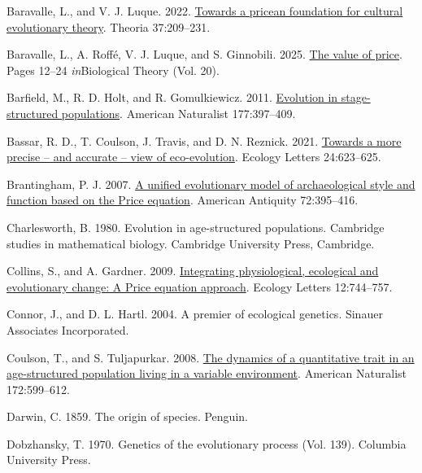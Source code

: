 \documentclass[
]{article}
\newlength{\cslhangindent}
\newenvironment{CSLReferences}[2] %
 {\begin{list}{}{%
  \setlength{\itemindent}{0pt}
  \setlength{\leftmargin}{0pt}
  \setlength{\parsep}{0pt}
  \ifodd #1
   \setlength{\leftmargin}{\cslhangindent}
   \setlength{\itemindent}{-1\cslhangindent}
  \fi
  \setlength{\itemsep}{#2\baselineskip}}}
 {\end{list}}
\begin{document}
\label{refs}
\begin{CSLReferences}{0}{0}
Baravalle, L., and V. J. Luque. 2022.
\href{https://doi.org/10.1387/theoria.21940}{Towards a pricean
foundation for cultural evolutionary theory}. Theoria 37:209--231.

Baravalle, L., A. Roffé, V. J. Luque, and S. Ginnobili. 2025.
\href{https://doi.org/10.1007/s13752-024-00482-4}{The value of price}.
Pages 12--24 \emph{in}Biological Theory (Vol. 20).

Barfield, M., R. D. Holt, and R. Gomulkiewicz. 2011.
\href{https://doi.org/10.1086/658903}{Evolution in stage-structured
populations}. American Naturalist 177:397--409.

Bassar, R. D., T. Coulson, J. Travis, and D. N. Reznick. 2021.
\href{https://doi.org/10.1111/ele.13712}{Towards a more precise -- and
accurate -- view of eco-evolution}. Ecology Letters 24:623--625.

Brantingham, P. J. 2007. \href{https://doi.org/10.2307/40035853}{{A
unified evolutionary model of archaeological style and function based on
the Price equation}}. American Antiquity 72:395--416.

Charlesworth, B. 1980. Evolution in age-structured populations.
Cambridge studies in mathematical biology. Cambridge University Press,
Cambridge.

Collins, S., and A. Gardner. 2009.
\href{https://doi.org/10.1111/j.1461-0248.2009.01340.x}{{Integrating
physiological, ecological and evolutionary change: A Price equation
approach}}. Ecology Letters 12:744--757.

Connor, J., and D. L. Hartl. 2004. {A premier of ecological genetics}.
Sinauer Associates Incorporated.

Coulson, T., and S. Tuljapurkar. 2008.
\href{https://doi.org/10.1086/591693}{The dynamics of a quantitative
trait in an age-structured population living in a variable environment}.
American Naturalist 172:599--612.

Darwin, C. 1859. The origin of species. Penguin.

Dobzhansky, T. 1970. Genetics of the evolutionary process (Vol. 139).
Columbia University Press.


\end{CSLReferences}
\end{document}
